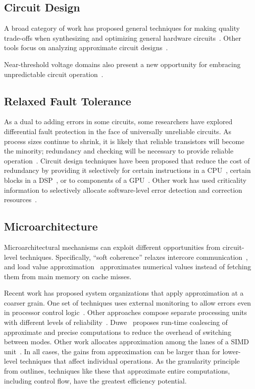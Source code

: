 \subsection{Circuit Design}

A broad category of work has proposed general techniques for making quality trade-offs
when synthesizing and optimizing general hardware
circuits~\cite{lossysynthesis, palem-pruning, rahimi, axilog, miao-thesis, synthesis-date14, venkataramani-date13, venkataramani-dac12}.
Other tools focus on analyzing approximate circuit
designs~\cite{venkatesan-iccad11, tziantzioulis-dac15}.

Near-threshold voltage domains also present a new opportunity for embracing
unpredictable circuit operation~\cite{soft-ntc}.

\subsection{Relaxed Fault Tolerance}

As a dual to adding errors in some circuits, some researchers have
explored differential fault protection in the face of universally unreliable
circuits. As process sizes continue to shrink, it is likely that reliable
transistors will become the minority; redundancy and checking will be
necessary to provide reliable operation~\cite{li-asplos08}. Circuit design
techniques have been proposed that reduce the cost of redundancy by providing
it selectively for certain instructions in a CPU~\cite{wreft}, certain
blocks in a DSP~\cite{unequal-protection, ant, micropower-dsp},
or to components of a GPU~\cite{palframan-gpu}.
Other work has used criticality information to selectively allocate
software-level error detection and correction
resources~\cite{khudia-tolerance, shi-cal, relax}.

\subsection{Microarchitecture}

Microarchitectural mechanisms can exploit different opportunities from
circuit-level techniques.
Specifically, ``soft coherence'' relaxes intercore
communication~\cite{softcoherence},
and load value approximation~\cite{lva-sanmiguel, lva-thwaites} approximates
numerical values instead of fetching them from main memory on cache misses.

Recent work has proposed system organizations that apply approximation at a
coarser grain.
One set of techniques uses external monitoring to
allow errors even in processor control logic~\cite{martonosi-date, commguard}.
Other approaches compose separate processing units with different levels of
reliability~\cite{ersa}.
Duwe~\cite{duwe-thesis} proposes run-time coalescing of approximate and
precise computations to reduce the overhead of switching between modes.
Other work allocates approximation among the lanes of a SIMD
unit~\cite{tabsh}.
In all cases, the gains from approximation can be larger than for lower-level
techniques that affect individual operations.
As the granularity principle from  outlines,
techniques like these that approximate entire computations, including control
flow, have the greatest efficiency potential.

